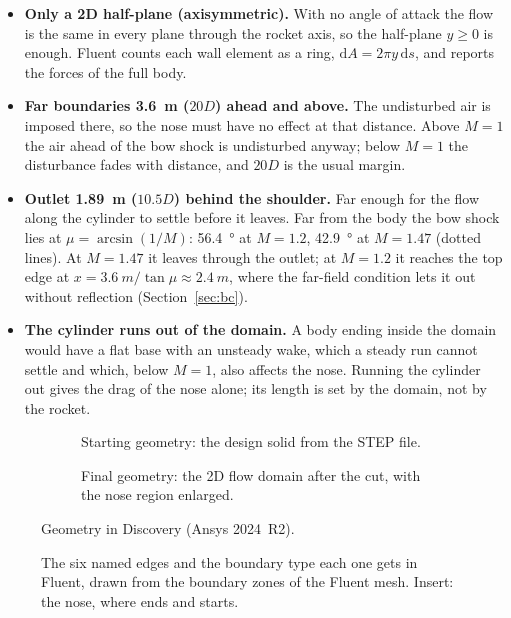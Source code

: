 \begin{itemize}
\item \textbf{Only a 2D half-plane (axisymmetric).} With no angle of attack the flow is the same in every
plane through the rocket axis, so the half-plane $y \geq 0$ is enough. Fluent counts each wall element as
a ring, $\mathrm dA = 2\pi y\,\mathrm ds$, and reports the forces of the full body.
\item \textbf{Far boundaries \SI{3.6}{m} ($20D$) ahead and above.} The undisturbed air is imposed there,
so the nose must have no effect at that distance. Above $M = 1$ the air ahead of the bow shock is
undisturbed anyway; below $M = 1$ the disturbance fades with distance, and $20D$ is the usual margin.
\item \textbf{Outlet \SI{1.89}{m} ($10.5D$) behind the shoulder.} Far enough for the flow along the
cylinder to settle before it leaves. Far from the body the bow shock lies at $\mu = \arcsin(1/M)$:
\SI{56.4}{\degree} at $M = 1.2$, \SI{42.9}{\degree} at $M = 1.47$ (dotted lines). At $M = 1.47$ it leaves
through the outlet; at $M = 1.2$ it reaches the top edge at $x = \SI{3.6}{m}/\tan\mu \approx \SI{2.4}{m}$,
where the far-field condition lets it out without reflection (Section~\ref{sec:bc}).
\item \textbf{The cylinder runs out of the domain.} A body ending inside the domain would have a flat base
with an unsteady wake, which a steady run cannot settle and which, below $M = 1$, also affects the nose.
Running the cylinder out gives the drag of the nose alone; its length is set by the domain, not by the
rocket.
\end{itemize}

\begin{figure}[H]
\centering
\begin{subfigure}[t]{0.48\linewidth}
\centering
{}
\caption{Starting geometry: the design solid from the STEP file.}
\label{fig:geom-step}
\end{subfigure}\hfill
\begin{subfigure}[t]{0.48\linewidth}
\centering
{}
\caption{Final geometry: the 2D flow domain after the cut, with the nose region enlarged.}
\label{fig:geom-domain}
\end{subfigure}
\caption{Geometry in Discovery (Ansys 2024~R2).}
\label{fig:geom}
\end{figure}

\begin{figure}[H]
\centering
{}
\caption{The six named edges and the boundary type each one gets in Fluent, drawn from the boundary
zones of the Fluent mesh. Insert: the nose, where  ends and  starts.}
\label{fig:geom-named}
\end{figure}
